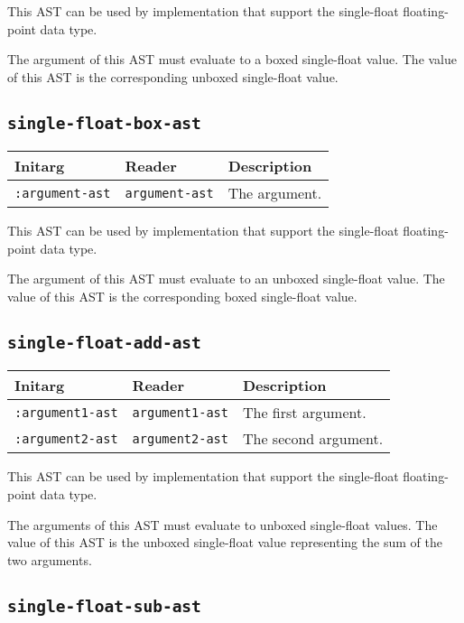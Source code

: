 This AST can be used by implementation that support the single-float
floating-point data type.  

The argument of this AST must evaluate to a boxed single-float value.
The value of this AST is the corresponding unboxed single-float value.

\subsection{\texttt{single-float-box-ast}}
\label{sec-ast-single-float-box}

\begin{tabular}{|l|l|l|}
\hline
Initarg & Reader & Description\\
\hline\hline
\texttt{:argument-ast} & \texttt{argument-ast} & The argument.\\
\hline
\end{tabular}

This AST can be used by implementation that support the single-float
floating-point data type.  

The argument of this AST must evaluate to an unboxed single-float
value.  The value of this AST is the corresponding boxed single-float
value.

\subsection{\texttt{single-float-add-ast}}
\label{sec-ast-single-float-add}

\begin{tabular}{|l|l|l|}
\hline
Initarg & Reader & Description\\
\hline\hline
\texttt{:argument1-ast} & \texttt{argument1-ast} & The first argument.\\
\hline
\texttt{:argument2-ast} & \texttt{argument2-ast} & The second argument.\\
\hline
\end{tabular}

This AST can be used by implementation that support the single-float
floating-point data type.  

The arguments of this AST must evaluate to unboxed single-float
values.  The value of this AST is the unboxed single-float value
representing the sum of the two arguments.

\subsection{\texttt{single-float-sub-ast}}
\label{sec-ast-single-float-sub}

